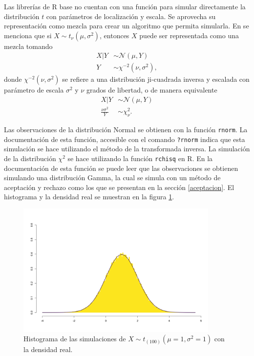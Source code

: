 \documentclass[11pt,a4paper]{article}
\begin{document}
Las librerías de R base no cuentan con una función para simular directamente la distribución $t$ con parámetros de localización y escala. Se aprovecha su representación como mezcla para crear un algoritmo que permita simularla. En \citet{gelman} se menciona que si $X\sim t_\nu (\mu, \sigma^2)$, entonces $X$ puede ser representada como una mezcla tomando 
\begin{align*}
X|Y &\sim \mathcal{N}(\mu , Y)\\
Y &\sim \chi ^{-2}(\nu, \sigma ^2),
\end{align*}
donde $\chi ^{-2}(\nu, \sigma ^2)$ se refiere a una distribución ji-cuadrada inversa y escalada con parámetro de escala $\sigma^2$ y $\nu$ grados de libertad, o de manera equivalente
\begin{align*}
X|Y &\sim \mathcal{N}(\mu , Y)\\
\frac{\nu\sigma ^2}{Y} &\sim \chi ^2_{\nu}.
\end{align*}

Las observaciones de la distribución Normal se obtienen con la función \texttt{rnorm}. La documentación de esta función, accesible con el comando \texttt{?rnorm} indica que esta simulación se hace utilizando el método de la transformada inversa. La simulación de la distribución $\chi^2$ se hace utilizando la función \texttt{rchisq} en R. En la documentación de esta función se puede leer que las observaciones se obtienen simulando una distribución Gamma, la cual se simula con un método de aceptación y rechazo como los que se presentan en la sección \ref{aceptacion}. El histograma y la densidad real se muestran en la figura \ref{fig:t}.

\begin{figure}[!htb]
\centering\includegraphics[width=10cm]{sim_mezcla.png}
\caption{Histograma de las simulaciones de $X \sim t_{(100)} (\mu = 1, \sigma^2 = 1)$ con la densidad real.}
\label{fig:t}
\end{figure}
\end{document}
